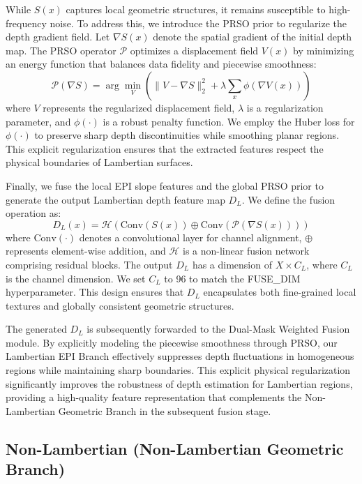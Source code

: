 While $S(x)$ captures local geometric structures, it remains susceptible to high-frequency noise. To address this, we introduce the PRSO prior to regularize the depth gradient field. Let $\nabla S(x)$ denote the spatial gradient of the initial depth map. The PRSO operator $\mathcal{P}$ optimizes a displacement field $V(x)$ by minimizing an energy function that balances data fidelity and piecewise smoothness:
\begin{equation}
\label{eq:eq10}
\mathcal{P}(\nabla S) = \arg\min_{V} \left( \| V - \nabla S \|_2^2 + \lambda \sum_{x} \phi(\nabla V(x)) \right)
\end{equation}
where $V$ represents the regularized displacement field, $\lambda$ is a regularization parameter, and $\phi(\cdot)$ is a robust penalty function. We employ the Huber loss for $\phi(\cdot)$ to preserve sharp depth discontinuities while smoothing planar regions. This explicit regularization ensures that the extracted features respect the physical boundaries of Lambertian surfaces.

Finally, we fuse the local EPI slope features and the global PRSO prior to generate the output Lambertian depth feature map $D_L$. We define the fusion operation as:
\begin{equation}
\label{eq:eq11}
D_L(x) = \mathcal{H} \left( \text{Conv}(S(x)) \oplus \text{Conv}(\mathcal{P}(\nabla S(x))) \right)
\end{equation}
where $\text{Conv}(\cdot)$ denotes a convolutional layer for channel alignment, $\oplus$ represents element-wise addition, and $\mathcal{H}$ is a non-linear fusion network comprising residual blocks. The output $D_L$ has a dimension of $X \times C_L$, where $C_L$ is the channel dimension. We set $C_L$ to 96 to match the FUSE_DIM hyperparameter. This design ensures that $D_L$ encapsulates both fine-grained local textures and globally consistent geometric structures.

The generated $D_L$ is subsequently forwarded to the Dual-Mask Weighted Fusion module. By explicitly modeling the piecewise smoothness through PRSO, our Lambertian EPI Branch effectively suppresses depth fluctuations in homogeneous regions while maintaining sharp boundaries. This explicit physical regularization significantly improves the robustness of depth estimation for Lambertian regions, providing a high-quality feature representation that complements the Non-Lambertian Geometric Branch in the subsequent fusion stage.

\subsection{Non-Lambertian (Non-Lambertian Geometric Branch)}

